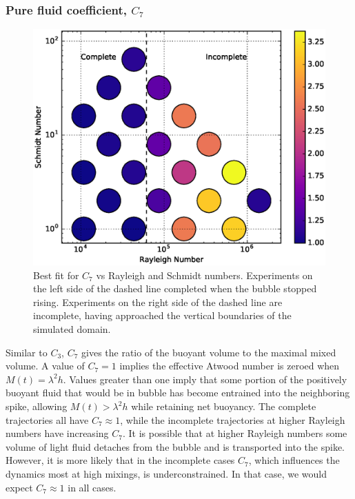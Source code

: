 \subsubsection{Pure fluid coefficient, $C_7$}
\begin{figure}
\includegraphics[width=\columnwidth]{figs/C7-vs-Rayleigh-Schmidt}
\caption{ 
  Best fit for $C_7$ vs Rayleigh and Schmidt numbers.
  Experiments on the left side of the dashed line completed when the bubble stopped rising.
  Experiments on the right side of the dashed line are incomplete, having approached the vertical boundaries of the simulated domain.
}
\end{figure}

Similar to $C_3$, $C_7$ gives the ratio of the buoyant volume to the maximal mixed volume.
A value of $C_7 = 1$ implies the effective Atwood number is zeroed when $M(t) = \lambda^2 h$.
Values greater than one imply that some portion of the positively buoyant fluid that would be in bubble has become entrained into the neighboring spike, allowing $M(t) > \lambda^2 h$ while retaining net buoyancy.
The complete trajectories all have $C_7 \approx 1$, while the incomplete trajectories at higher Rayleigh numbers have increasing $C_7$.
It is possible that at higher Rayleigh numbers some volume of light fluid detaches from the bubble and is transported into the spike.
However, it is more likely that in the incomplete cases $C_7$, which influences the dynamics most at high mixings, is underconstrained.
In that case, we would expect $C_7 \approx 1$ in all cases. 


